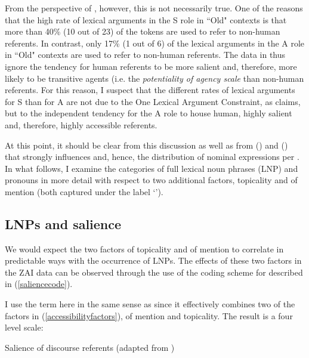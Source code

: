 From the perspective of , however, this is not necessarily true. One of the reasons that the high rate of lexical arguments in the S role in ``Old" contexts is that more than 40{\%} (10 out of 23) of the tokens are used to refer to non-human referents. In contrast, only 17{\%} (1 out of 6) of the lexical arguments in the A role in ``Old" contexts are used to refer to non-human referents. The data in  thus ignore the tendency for human referents to be more salient and, therefore, more likely to be transitive agents (i.e. the \textit{potentiality of agency scale} \citet{silverstein1976} than non-human referents. For this reason, I suspect that the different rates of lexical arguments for S than for A are not due to the One Lexical Argument Constraint, as \citet{arnold2003} claims, but to the independent tendency for the A role to house human, highly salient and, therefore, highly accessible referents.


At this point, it should be clear from this discussion as well as from  () and  () that  strongly influences  and, hence, the distribution of nominal expressions per . In what follows, I examine the categories of full lexical noun phrases (LNP) and pronouns in more detail with respect to two additional  factors, topicality and  of mention (both captured under the label `').


\subsection{LNPs and salience}\label{coding}

We would expect the two  factors of topicality and  of mention to correlate in predictable ways with the occurrence of LNPs. The effects of these two factors in the ZAI data can be observed through the use of the coding scheme for  described in (\ref{saliencecode}). 

I use the term  here in the same sense as \citet{arnold2003} since it effectively combines two of the factors in (\ref{accessibilityfactors}),  of mention and topicality. The result is a four level scale:


\ea\label{saliencecode}  Salience of discourse referents (adapted from \citet[231]{arnold2003})

